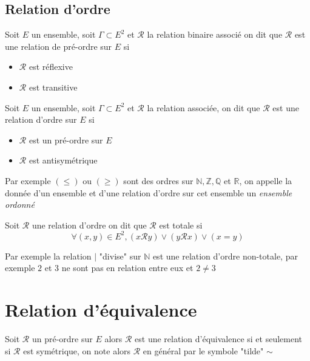 \documentclass[11pt,colorlinks]{book}
\theoremstyle{mytheoremstyle}
\theoremstyle{mytheoremstyle}
\theoremstyle{mytheoremstyle}
\theoremstyle{mytheoremstyle}
\theoremstyle{mytheoremstyle}
\theoremstyle{mytheoremstyle}
\theoremstyle{mytheoremstyle}
\theoremstyle{mytheoremstyle}
\theoremstyle{myproblemstyle}
\def\mbb#1{\mathbb{#1}}
\def\mfc#1{\mathcal{#1}}
\def\bN{\mbb{N}}
\def\bR{\mbb{R}}
\def\bQ{\mbb{Q}}
\def\bZ{\mbb{Z}}
\def\mR{\mfc{R}}
\begin{document}
\subsection{Relation d'ordre}
\begin{definition}
  Soit $E$ un ensemble, soit $\Gamma \subset E^2$ et $\mR$ la relation binaire associé on dit que $\mR$ est une relation de pré-ordre sur $E$ si
  \begin{itemize}
    \item $\mR$ est réflexive
    \item $\mR$ est transitive
  \end{itemize}
\end{definition}
\begin{definition}
  Soit $E$ un ensemble, soit $\Gamma \subset E^2$ et $\mR$ la relation associée, on dit que $\mR$ est une relation d'ordre sur $E$ si 
  \begin{itemize}
    \item $\mR$ est un pré-ordre sur $E$
    \item $\mR$ est antisymétrique
  \end{itemize}
\end{definition}
\begin{ex}
  Par exemple $(\leq)$ ou $(\geq)$ sont des ordres sur $\bN,\bZ,\bQ$ et $\bR$, on appelle la donnée d'un ensemble et d'une relation d'ordre sur cet ensemble 
  un \textit{ensemble ordonné}
\end{ex}
\begin{definition}
  Soit $\mR$ une relation d'ordre on dit que $\mR$ est totale si 
  \begin{equation*}
    \forall (x,y) \in E^2, (x\mR y) \vee (y\mR x) \vee (x=y)
  \end{equation*}
\end{definition}
\begin{ex}
  Par exemple la relation $|$ "divise" sur $\bN$ est une relation d'ordre non-totale, par exemple $2$ et $3$ ne sont pas en relation entre eux et $2 \not= 3$
\end{ex}
\section{Relation d'équivalence}
\begin{definition}
  Soit $\mR$ un pré-ordre sur $E$ alors $\mR$ est une relation d'équivalence si et seulement si $\mR$ est symétrique, on note alors $\mR$ en général par le symbole "tilde" $\sim$
\end{definition}
\end{document}
